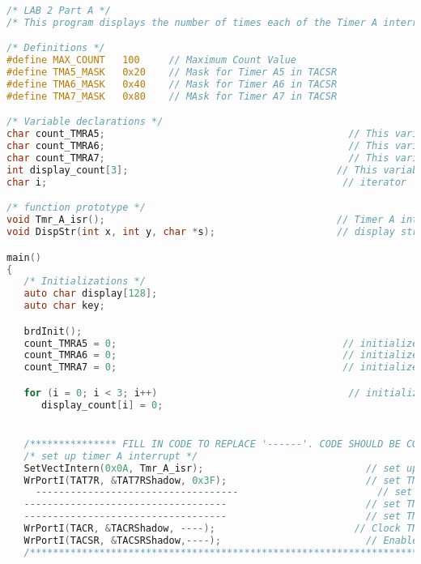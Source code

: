 \begin{lstlisting}[language=C]
/* LAB 2 Part A */
/* This program displays the number of times each of the Timer A interrupts have occured on the computer monitor */

/* Definitions */
#define MAX_COUNT   100     // Maximum Count Value
#define TMA5_MASK   0x20    // Mask for Timer A5 in TACSR
#define TMA6_MASK   0x40    // Mask for Timer A6 in TACSR
#define TMA7_MASK   0x80    // MAsk for Timer A7 in TACSR

/* Variable declarations */
char count_TMRA5;                                          // This variable will count the number of times Timer A5 has triggered an interrupted
char count_TMRA6;                                          // This variable will count the number of times Timer A6 has triggered an interrupted
char count_TMRA7;                                          // This variable will count the number of times Timer A7 has triggered an interrupted
int display_count[3];                                    // This variable will hold the count values divided by 100
char i;                                                   // iterator

/* function prototype */
void Tmr_A_isr();                                        // Timer A interrupt service routine
void DispStr(int x, int y, char *s);                     // display strings on computer monitor

main()
{
   /* Initializations */
   auto char display[128];
   auto char key;

   brdInit();
   count_TMRA5 = 0;                                       // initialize counters to zero
   count_TMRA6 = 0;                                       // initialize counters to zero
   count_TMRA7 = 0;                                       // initialize counters to zero

   for (i = 0; i < 3; i++)                                 // initialize display counters to zero
      display_count[i] = 0;


   /*************** FILL IN CODE TO REPLACE '------'. CODE SHOULD BE CONSISTENT WITH COMMENTS. REFER TO FIGURE 5. IN LAB MANUAL. *******************/
   /* set up timer A interrupt */
   SetVectIntern(0x0A, Tmr_A_isr);                            // set up timer A interrupt vector
   WrPortI(TAT7R, &TAT7RShadow, 0x3F);                        // set TMRA7 to count down from 63
     -----------------------------------                        // set TMRA6 to count down from 127
   -----------------------------------                        // set TMRA5 to count down from 255
   -----------------------------------                        // set TMRA1 to count down from 255
   WrPortI(TACR, &TACRShadow, ----);                        // Clock TMRA5,TMRA6,TMRA7 by TMRA1. Clock TMRA4 by PCLK/2. Set Timer A to trigger priority 1 interrupts
   WrPortI(TACSR, &TACSRShadow,----);                         // Enable interrupts for TMRA5,TMRA6,TMRA7 only. Enable main clock for Timer A
   /************************************************************************************************************************************************/



\end{lstlisting}
